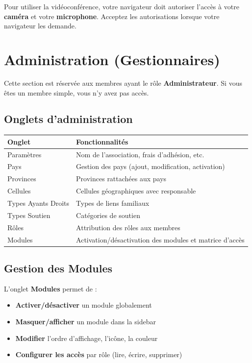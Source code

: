 \documentclass[12pt,a4paper]{article}
\begin{document}
\begin{attentionbox}[Prérequis]
Pour utiliser la vidéoconférence, votre navigateur doit autoriser l'accès à votre \textbf{caméra} et votre \textbf{microphone}. Acceptez les autorisations lorsque votre navigateur les demande.
\end{attentionbox}

\section{Administration (Gestionnaires)}

\begin{attentionbox}
Cette section est réservée aux membres ayant le rôle \textbf{Administrateur}. Si vous êtes un membre simple, vous n'y avez pas accès.
\end{attentionbox}

\subsection{Onglets d'administration}

\begin{tabularx}{\textwidth}{lX}
\toprule
\textbf{Onglet} & \textbf{Fonctionnalités} \\
\midrule
Paramètres & Nom de l'association, frais d'adhésion, etc. \\
Pays & Gestion des pays (ajout, modification, activation) \\
Provinces & Provinces rattachées aux pays \\
Cellules & Cellules géographiques avec responsable \\
Types Ayants Droits & Types de liens familiaux \\
Types Soutien & Catégories de soutien \\
Rôles & Attribution des rôles aux membres \\
Modules & Activation/désactivation des modules et matrice d'accès \\
\bottomrule
\end{tabularx}

\subsection{Gestion des Modules}

L'onglet \textbf{Modules} permet de :
\begin{itemize}
    \item \textbf{Activer/désactiver} un module globalement
    \item \textbf{Masquer/afficher} un module dans la sidebar
    \item \textbf{Modifier} l'ordre d'affichage, l'icône, la couleur
    \item \textbf{Configurer les accès} par rôle (lire, écrire, supprimer)
\end{itemize}
\end{document}
